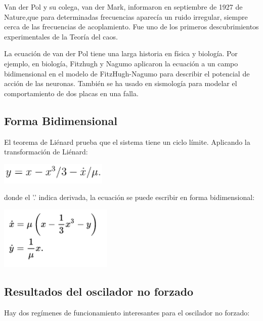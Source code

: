 \documentclass{article}
\begin{document}
\vspace{0.1cm}

Van der Pol y su colega, van der Mark, informaron en septiembre de 1927 de Nature,que para determinadas frecuencias aparecía un ruido irregular, siempre cerca de las frecuencias de acoplamiento. Fue uno de los primeros descubrimientos experimentales de la Teoría del caos.

\vspace{0.1cm}

La ecuación de van der Pol tiene una larga historia en física y biología. Por ejemplo, en biología, Fitzhugh y Nagumo aplicaron la ecuación a un campo bidimensional en el modelo de FitzHugh-Nagumo para describir el potencial de acción de las neuronas. También se ha usado en sismología para modelar el comportamiento de dos placas en una falla.


\subsection{Forma Bidimensional}

El teorema de Liénard prueba que el sistema tiene un ciclo límite. Aplicando la transformación de Liénard:

\begin{center}
\includegraphics[height=1cm]{fig2.png}
\end{center}

donde el '.' indica derivada, la ecuación se puede escribir en forma bidimensional:

\begin{center}
\includegraphics[height=3cm]{fig3.png}
\end{center}


\subsection{Resultados del oscilador no forzado}

Hay dos regímenes de funcionamiento interesantes para el oscilador no forzado:
\end{document}
